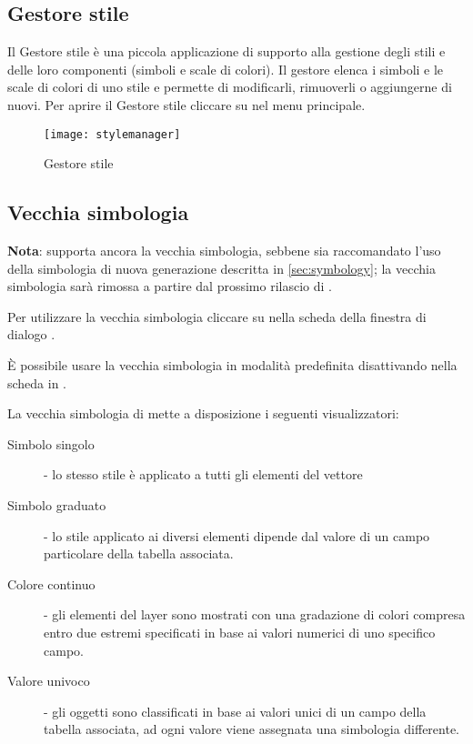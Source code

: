 \subsection{Gestore stile}\label{subsec:stylemanager}

Il Gestore stile è una piccola applicazione di supporto alla gestione degli stili e delle 
loro componenti (simboli e scale di colori). Il gestore elenca i simboli e le scale di colori 
di uno stile e permette di modificarli, rimuoverli o aggiungerne di nuovi.
Per aprire il Gestore stile cliccare su  \arrow 
{} nel menu principale.

\begin{figure}[ht]
   \centering
   \texttt{[image: stylemanager]}
   \caption{Gestore stile \wincaption}\label{fig:stylemanager}
\end{figure}

\subsection{Vecchia simbologia}\label{sec:oldsymbology}

\textbf{Nota}:  supporta ancora la vecchia simbologia, sebbene sia raccomandato 
l'uso della simbologia di nuova generazione descritta in \ref{sec:symbology}; 
la vecchia simbologia sarà rimossa a partire dal prossimo rilascio di \qg.

Per utilizzare la vecchia simbologia cliccare su  nella 
scheda  della finestra di dialogo . 

È possibile usare la vecchia simbologia in modalità predefinita disattivando  nella scheda  in
 \arrow {}.

La vecchia simbologia di \qg mette a disposizione i seguenti visualizzatori:

\begin{description} 
    \item[Simbolo singolo] - lo stesso stile è applicato a tutti gli elementi del vettore
    \item[Simbolo graduato] - lo stile applicato ai diversi elementi dipende
    dal valore di un campo particolare della tabella associata.
    \item[Colore continuo] - gli elementi del layer sono mostrati con una
    gradazione di colori compresa entro due estremi specificati in base ai valori numerici di uno specifico campo.
    \item[Valore univoco] - gli oggetti sono classificati in base ai valori
    unici di un campo della tabella associata, ad ogni valore viene assegnata una
    simbologia differente.
\end{description}

